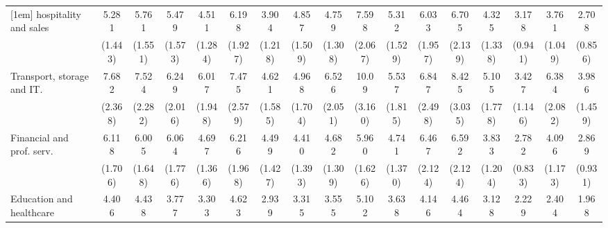 {\begin{tabular}{l*{16}{c}}
[1em]
hospitality and sales&       5.281\sym{***}&       5.761\sym{***}&       5.479\sym{***}&       4.511\sym{***}&       6.198\sym{***}&       3.904\sym{***}&       4.857\sym{***}&       4.759\sym{***}&       7.598\sym{***}&       5.312\sym{***}&       6.033\sym{***}&       6.705\sym{***}&       4.325\sym{***}&       3.178\sym{***}&       3.761\sym{***}&       2.708\sym{**} \\
                    &     (1.443)         &     (1.551)         &     (1.573)         &     (1.284)         &     (1.927)         &     (1.218)         &     (1.509)         &     (1.308)         &     (2.067)         &     (1.529)         &     (1.957)         &     (2.139)         &     (1.338)         &     (0.941)         &     (1.049)         &     (0.856)         \\
[1em]
Transport, storage and IT.&       7.682\sym{***}&       7.524\sym{***}&       6.249\sym{***}&       6.017\sym{***}&       7.475\sym{***}&       4.621\sym{***}&       4.968\sym{***}&       6.526\sym{***}&       10.09\sym{***}&       5.537\sym{***}&       6.847\sym{***}&       8.425\sym{***}&       5.105\sym{***}&       3.427\sym{***}&       6.384\sym{***}&       3.986\sym{***}\\
                    &     (2.368)         &     (2.282)         &     (2.016)         &     (1.948)         &     (2.579)         &     (1.585)         &     (1.704)         &     (2.051)         &     (3.160)         &     (1.815)         &     (2.498)         &     (3.035)         &     (1.778)         &     (1.146)         &     (2.082)         &     (1.459)         \\
[1em]
Financial and prof. serv.&       6.118\sym{***}&       6.005\sym{***}&       6.064\sym{***}&       4.697\sym{***}&       6.216\sym{***}&       4.499\sym{***}&       4.410\sym{***}&       4.682\sym{***}&       5.960\sym{***}&       4.741\sym{***}&       6.467\sym{***}&       6.592\sym{***}&       3.833\sym{***}&       2.782\sym{***}&       4.096\sym{***}&       2.869\sym{**} \\
                    &     (1.706)         &     (1.648)         &     (1.776)         &     (1.366)         &     (1.968)         &     (1.427)         &     (1.393)         &     (1.309)         &     (1.626)         &     (1.370)         &     (2.124)         &     (2.124)         &     (1.204)         &     (0.833)         &     (1.173)         &     (0.931)         \\
[1em]
Education and healthcare&       4.406\sym{***}&       4.438\sym{***}&       3.777\sym{***}&       3.303\sym{***}&       4.623\sym{***}&       2.939\sym{***}&       3.315\sym{***}&       3.555\sym{***}&       5.102\sym{***}&       3.638\sym{***}&       4.146\sym{***}&       4.464\sym{***}&       3.128\sym{***}&       2.229\sym{**} &       2.404\sym{**} &       1.968\sym{*}  \\

\end{tabular}}
